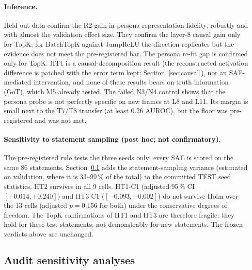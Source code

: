 \paragraph{Inference.} Held-out data confirm the R2 gain in persona representation fidelity, robustly and with almost
the validation effect size. They confirm the layer-8 causal gain only for TopK; for BatchTopK against JumpReLU the
direction replicates but the evidence does not meet the pre-registered bar. The persona re-fit gap is confirmed only
for TopK. HT1 is a causal-decomposition result (the reconstructed activation difference is patched with the error
term kept; Section~\ref{sec:causal}), not an SAE-mediated intervention, and none of these results bears on truth
information (GoT), which M5 already tested. The failed N3/N4 control shows that the persona probe is not perfectly
specific on new frames at L8 and L11. Its margin is small next to the T7/T8 transfer (at least 0.26 AUROC), but the
floor was pre-registered and was not met.

\paragraph{Sensitivity to statement sampling (post hoc; not confirmatory).} The pre-registered rule tests the three
seeds only; every SAE is scored on the same 86 statements. Section~\ref{sec:audit} adds the statement-sampling
variance (estimated on validation, where it is 33--99\,\% of the total) to the committed TEST seed statistics. HT2
survives in all 9 cells. HT1-C1 (adjusted 95\,\% CI $[+0.014, +0.240]$) and HT3-C1 ($[-0.093, -0.002]$) do not
survive Holm over the 13 cells (adjusted $p=0.156$ for both) under the conservative degrees of freedom. The TopK
confirmations of HT1 and HT3 are therefore fragile: they hold for these test statements, not demonstrably for new
statements. The frozen verdicts above are unchanged.



\subsection{Audit sensitivity analyses}\label{sec:audit}

